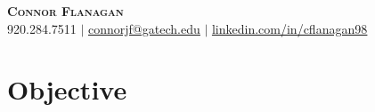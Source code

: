 \documentclass[letterpaper,11pt]{article}
\begin{document}


            \begin{center}
              \textbf{\Huge \scshape Connor Flanagan} \\ \vspace{1pt}
              \small 920.284.7511 $|$ \href{mailto:connorjf@gatech.edu}{\underline{connorjf@gatech.edu}} $|$ 
              \href{https://linkedin.com/in/cflanagan98}{\underline{linkedin.com/in/cflanagan98}}
            \end{center}

            \section{Objective}
\end{document}
